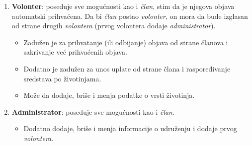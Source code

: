 \begin{enumerate}
    \item \textbf{Volonter}: poseduje sve mogućnosti kao i \textit{član}, stim da je njegova objava automatski prihvaćena. Da bi \textit{član} postao \textit{volonter}, on mora
    da bude izglasan od strane drugih \textit{volontera} (prvog volontera dodaje \textit{administrator}). 
    \begin{itemize}
        \item Zadužen je za prihvatanje (ili odbijanje) objava od strane članova i sakrivanje već prihvaćenih objava.
        \item Dodatno je zadužen za unos uplate od strane člana i raspoređivanje sredstava po životinjama.
        \item Može da dodaje, briše i menja podatke o vrsti životinja.
    \end{itemize}
    \item \textbf{Administrator}: poseduje sve mogućnosti kao i \textit{član}. 
    \begin{itemize}
        \item Dodatno dodaje, briše i menja informacije o udruženju i dodaje prvog \textit{volontera}.
    \end{itemize}
    
\end{enumerate}